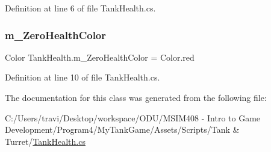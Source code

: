 Definition at line 6 of file Tank\+Health.\+cs.

\mbox{\label{class_tank_health_aa0c52687011855683ffb71b787f159fb}} 
\subsubsection{\texorpdfstring{m\+\_\+\+Zero\+Health\+Color}{m\_ZeroHealthColor}}
{\footnotesize\ttfamily Color Tank\+Health.\+m\+\_\+\+Zero\+Health\+Color = Color.\+red}



Definition at line 10 of file Tank\+Health.\+cs.



The documentation for this class was generated from the following file\+:\begin{DoxyCompactItemize}
\item 
C\+:/\+Users/travi/\+Desktop/workspace/\+O\+D\+U/\+M\+S\+I\+M408 -\/ Intro to Game Development/\+Program4/\+My\+Tank\+Game/\+Assets/\+Scripts/\+Tank \& Turret/\hyperlink{_tank_health_8cs}{Tank\+Health.\+cs}\end{DoxyCompactItemize}
